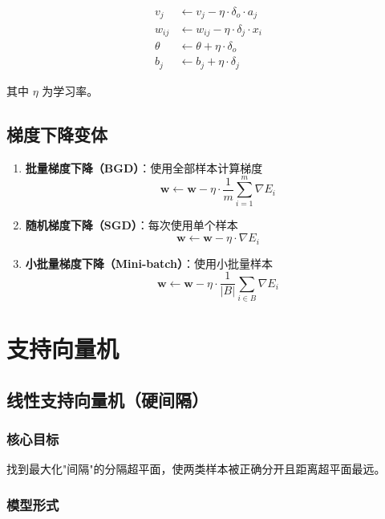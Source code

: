 \documentclass[12pt,a4paper]{ctexart}
\begin{document}
\begin{align}
v_j &\leftarrow v_j - \eta \cdot \delta_o \cdot a_j \\
w_{ij} &\leftarrow w_{ij} - \eta \cdot \delta_j \cdot x_i \\
\theta &\leftarrow \theta + \eta \cdot \delta_o \\
b_j &\leftarrow b_j + \eta \cdot \delta_j
\end{align}

其中 $\eta$ 为学习率。

\subsection{梯度下降变体}

\begin{enumerate}
    \item \textbf{批量梯度下降（BGD）}：使用全部样本计算梯度
    \[
    \mathbf{w} \leftarrow \mathbf{w} - \eta \cdot \frac{1}{m}\sum_{i=1}^{m}\nabla E_i
    \]
    
    \item \textbf{随机梯度下降（SGD）}：每次使用单个样本
    \[
    \mathbf{w} \leftarrow \mathbf{w} - \eta \cdot \nabla E_i
    \]
    
    \item \textbf{小批量梯度下降（Mini-batch）}：使用小批量样本
    \[
    \mathbf{w} \leftarrow \mathbf{w} - \eta \cdot \frac{1}{|B|}\sum_{i \in B}\nabla E_i
    \]
\end{enumerate}


\section{支持向量机}

\subsection{线性支持向量机（硬间隔）}

\subsubsection{核心目标}

找到最大化"间隔"的分隔超平面，使两类样本被正确分开且距离超平面最远。

\subsubsection{模型形式}
\end{document}
